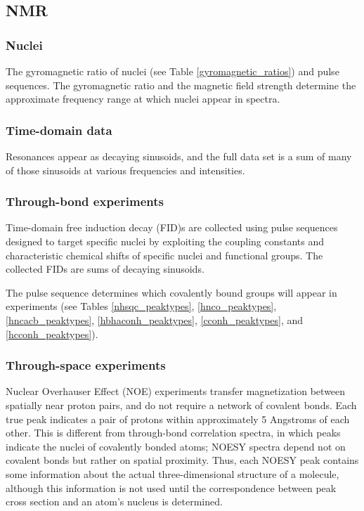 \subsection*{NMR}

\subsubsection{Nuclei}
The gyromagnetic ratio of nuclei (see Table \ref{gyromagnetic_ratios}) and 
pulse sequences.  The gyromagnetic ratio and the magnetic field strength 
determine the approximate frequency range at which nuclei appear in spectra.

\subsubsection{Time-domain data}
Resonances appear as decaying sinusoids, and the full data set is a sum of
many of those sinusoids at various frequencies and intensities.

\subsubsection{Through-bond experiments}
Time-domain free induction decay (FID)s are collected using
pulse sequences \cite{khaneja2005} designed to target specific nuclei by
exploiting the coupling constants and characteristic chemical shifts of specific 
nuclei and functional groups.  The collected FIDs are sums of decaying sinusoids.

The pulse sequence determines which covalently bound groups will appear in 
experiments (see Tables \ref{nhsqc_peaktypes}, \ref{hnco_peaktypes}, 
\ref{hncacb_peaktypes}, \ref{hbhaconh_peaktypes}, \ref{cconh_peaktypes}, and
\ref{hcconh_peaktypes}).

\subsubsection{Through-space experiments}
Nuclear Overhauser Effect (NOE) \cite{noe_kaiser} experiments transfer 
magnetization between spatially near proton pairs, and do not require a 
network of covalent bonds.  Each true peak indicates a pair of protons within 
approximately 5 Angstroms of each other.  This is different from 
through-bond correlation spectra, in which peaks indicate the nuclei of covalently 
bonded atoms; NOESY spectra depend not on covalent bonds but rather 
on spatial proximity.  Thus, each NOESY peak contains some information 
about the actual three-dimensional structure of a molecule, although this
information is not used until the correspondence between peak cross
section and an atom's nucleus is determined.

